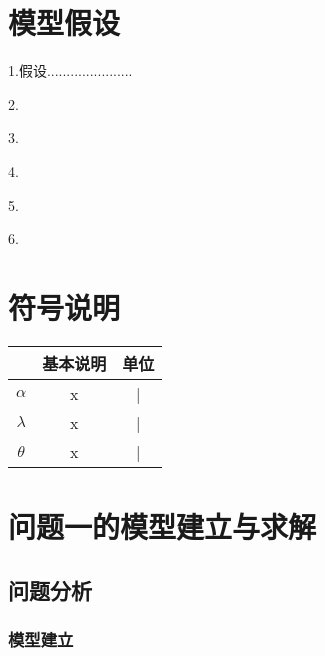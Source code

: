 \documentclass[UTF8]{ctexart}
\begin{document}
\section{模型假设}
1.假设......................

2.

3.

4.

5.

6.

\section{符号说明}


		\begin{table}[H] 
		\begin{center}  
		\begin{tabular}{c|c|c}    
		\toprule[2pt]    
		\rowcolor[gray]{0.8}

		\multicolumn{1}{m{8em}}{\centering 符号}  &\multicolumn{1}{m{15em}}{\centering 基本说明} &\multicolumn{1}{m{10em}}{\centering 单位}\\


		\midrule[1.3pt]
		    $\alpha$                                & x        & | \\
			$\lambda$                                & x        & |       \\
			$\theta$                                 & x        & |            \\


		\bottomrule[2pt]   
		\end{tabular}  
		\end{center}
		\end{table}




\section{问题一的模型建立与求解}
\subsection{问题分析}



\subsubsection{模型建立}
\end{document}
